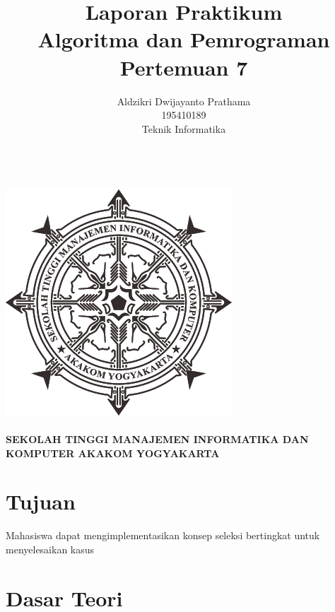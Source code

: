 \documentclass[a4paper,12pt]{article}
\begin{document}
\title{ {\Large Laporan Praktikum}\\ Algoritma dan Pemrograman \\{\Large Pertemuan 7}}

\author{Aldzikri Dwijayanto Prathama 
	\\195410189
	\\Teknik Informatika}
\makeatletter
\begin{titlepage}
	\begin{center}
		{\huge \bfseries \@title }\\[14ex]
		\includegraphics[scale=.8]{logo}\\[4ex]
		{\large \@author}\\[19ex]
		{\large \bfseries {SEKOLAH TINGGI MANAJEMEN INFORMATIKA DAN KOMPUTER
				AKAKOM YOGYAKARTA}}
	\end{center}


\end{titlepage}
\makeatother
\newpage
\tableofcontents
\newpage

\section{Tujuan}
Mahasiswa dapat mengimplementasikan konsep seleksi bertingkat untuk menyelesaikan kasus 
\section{Dasar Teori}
\end{document}
